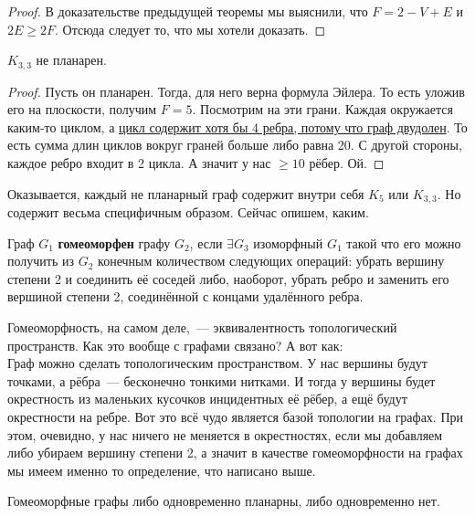 \documentclass{article}
\begin{document}
    \begin{proof}
        В доказательстве предыдущей теоремы мы выяснили, что $F=2-V+E$ и $2E\geqslant 2F$. Отсюда следует то, что мы хотели доказать.
    \end{proof}
    \begin{lemma}
        $K_{3,3}$ не планарен.
    \end{lemma}
    \begin{proof}
        Пусть он планарен. Тогда, для него верна формула Эйлера. То есть уложив его на плоскости, получим $F=5$. Посмотрим на эти грани. Каждая окружается каким-то циклом, а \underline{цикл содержит хотя бы 4 ребра, потому что граф двудолен}. То есть сумма длин циклов вокруг граней больше либо равна 20. С другой стороны, каждое ребро входит в 2 цикла. А значит у нас $\geqslant10$ рёбер. Ой.
    \end{proof}
    \begin{remark}
        Оказывается, каждый не планарный граф содержит внутри себя $K_5$ или $K_{3,3}$. Но содержит весьма специфичным образом. Сейчас опишем, каким.
    \end{remark}
    \begin{definition}
        Граф $G_1$ \textbf{гомеоморфен} графу $G_2$, если $\exists G_3$ изоморфный $G_1$ такой что его можно получить из $G_2$ конечным количеством следующих операций: убрать вершину степени 2 и соединить её соседей либо, наоборот, убрать ребро и заменить его вершиной степени 2, соединённой с концами удалённого ребра.
    \end{definition}
    \begin{remark}
        Гомеоморфность, на самом деле,~--- эквивалентность топологический пространств. Как это вообще с графами связано? А вот как:\\
        Граф можно сделать топологическим пространством. У нас вершины будут точками, а
        рёбра~--- бесконечно тонкими нитками. И тогда у вершины будет окрестность из маленьких кусочков инцидентных её рёбер, а ещё будут окрестности на ребре. Вот это всё чудо является базой топологии на графах. При этом, очевидно, у нас ничего не меняется в окрестностях, если мы добавляем либо убираем вершину степени 2, а значит в качестве гомеоморфности на графах мы имеем именно то определение, что написано выше.
    \end{remark}
    \begin{property}
        Гомеоморфные графы либо одновременно планарны, либо одновременно нет.
    \end{property}
\end{document}
